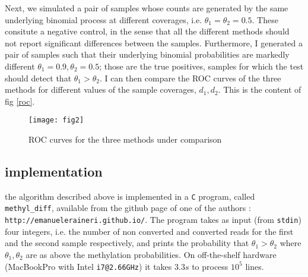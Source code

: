 \documentclass[11pt]{amsart}
\begin{document}
Next, we simulated a pair of samples whose counts are generated by the same underlying binomial process at different coverages, i.e. $\theta_1=\theta_2=0.5$. These consitute a negative control, in the sense that all the different methods should not report significant differences between the samples. Furthermore, I generated a pair of samples such that their underlying binomial probabilities are markedly different $\theta_1=0.9,\theta_2=0.5$; those are the true positives, samples for which the test should detect that $\theta_1>\theta_2$. I can then compare the ROC curves of the three methods for different values of the sample coverages, $d_1,d_2$. 
This is the content of fig \ref{roc}.
\begin{figure}[h]
\caption{ROC curves for the three methods under comparison}
\texttt{[image: fig2]}
\end{figure}\label{roc}
\subsection{implementation}
the algorithm described above is implemented in a \verb=C= program, called \verb=methyl_diff=, available from the github page of one of the authors : \verb=http://emanueleraineri.github.io/=. The program takes as input (from \verb=stdin=) four integers, i.e. the number of non converted and converted reads for the first and the second sample respectively, and prints the probability that $\theta_1>\theta_2$ where $\theta_1,\theta_2$ are as above the methylation probabilities. On off-the-shelf hardware (MacBookPro with Intel \verb=i7@2.66GHz=) it takes $3.3s$ to process $10^5$ lines.


\end{document}
